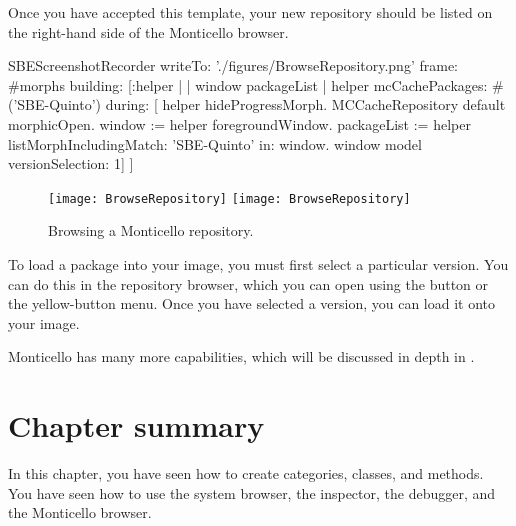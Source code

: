 \documentclass[a4paper,10pt,twoside]{book}
\begin{document}
Once you have accepted this template, your new repository should be listed on the right-hand side of the Monticello browser.

\begin{ExecuteSmalltalkScript}
SBEScreenshotRecorder writeTo: './figures/BrowseRepository.png' frame: #morphs building: [:helper |
	| window packageList |
	helper mcCachePackages: #('SBE-Quinto') during: [
		helper hideProgressMorph.
		MCCacheRepository default morphicOpen.
		window := helper foregroundWindow.
		packageList := helper listMorphIncludingMatch: 'SBE-Quinto' in: window.
		window model versionSelection: 1]
]
\end{ExecuteSmalltalkScript}
\begin{figure}[h]
\ifluluelse
	{{\texttt{[image: BrowseRepository]}}}
	{{\texttt{[image: BrowseRepository]}}}
\caption{Browsing a Monticello repository.
\label{fig:monticello3}}
\end{figure}


To load a package into your image, you must first select a particular version.
You can do this in the repository browser, which you can open using the  button or the yellow-button menu.
Once you have selected a version, you can load it onto your image.


Monticello has many more capabilities, which will be discussed in depth in .

\section{Chapter summary}
In this chapter, you have seen how to create categories, classes, and methods.
You have seen how to use the system browser, the inspector, the debugger, and the Monticello browser.
\end{document}

